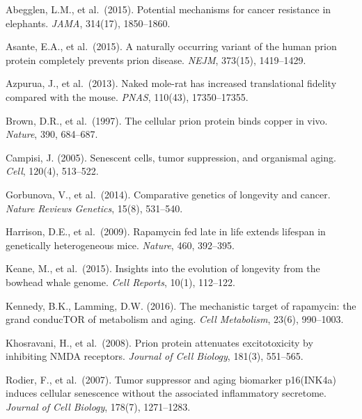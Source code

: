 \documentclass[12pt,a4paper]{article}
\begin{document}
\begin{enumerate}[label={[\arabic*]}, leftmargin=2.5em, itemsep=0.3em]

  \item Abegglen, L.M., et al.\ (2015). Potential mechanisms for cancer
    resistance in elephants. \textit{JAMA}, 314(17), 1850--1860.

  \item Asante, E.A., et al.\ (2015). A naturally occurring variant of the
    human prion protein completely prevents prion disease.
    \textit{NEJM}, 373(15), 1419--1429.

  \item Azpurua, J., et al.\ (2013). Naked mole-rat has increased
    translational fidelity compared with the mouse. \textit{PNAS}, 110(43),
    17350--17355.

  \item Brown, D.R., et al.\ (1997). The cellular prion protein binds copper
    in vivo. \textit{Nature}, 390, 684--687.

  \item Campisi, J. (2005). Senescent cells, tumor suppression, and
    organismal aging. \textit{Cell}, 120(4), 513--522.

  \item Gorbunova, V., et al.\ (2014). Comparative genetics of longevity and
    cancer. \textit{Nature Reviews Genetics}, 15(8), 531--540.

  \item Harrison, D.E., et al.\ (2009). Rapamycin fed late in life extends
    lifespan in genetically heterogeneous mice. \textit{Nature}, 460,
    392--395.

  \item Keane, M., et al.\ (2015). Insights into the evolution of longevity
    from the bowhead whale genome. \textit{Cell Reports}, 10(1), 112--122.

  \item Kennedy, B.K., Lamming, D.W. (2016). The mechanistic target of
    rapamycin: the grand conducTOR of metabolism and aging.
    \textit{Cell Metabolism}, 23(6), 990--1003.

  \item Khosravani, H., et al.\ (2008). Prion protein attenuates
    excitotoxicity by inhibiting NMDA receptors.
    \textit{Journal of Cell Biology}, 181(3), 551--565.

  \item Rodier, F., et al.\ (2007). Tumor suppressor and aging biomarker
    p16(INK4a) induces cellular senescence without the associated
    inflammatory secretome. \textit{Journal of Cell Biology}, 178(7),
    1271--1283.


\end{enumerate}
\end{document}

